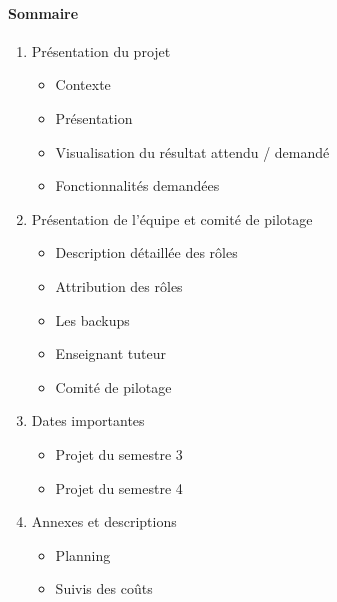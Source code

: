 \documentclass[11pt]{report}
\begin{document}
\paragraph{\LARGE Sommaire}
\begin{enumerate}
	\item Présentation du projet
	\begin{itemize}
	    \item Contexte
	    \item Présentation
	    \item Visualisation du résultat attendu / demandé
	    \item Fonctionnalités demandées
	\end{itemize}
	\item Présentation de l'équipe et comité de pilotage
    	\begin{itemize}
    	    \item Description détaillée des rôles
    	    \item Attribution des rôles
    	    \item Les backups
    	    \item Enseignant tuteur
    	    \item Comité de pilotage
    	\end{itemize}
	\item Dates importantes
    	\begin{itemize}
    	    \item Projet du semestre 3
    	    \item Projet du semestre 4
    	\end{itemize}
    \item Annexes et descriptions
        \begin{itemize}
    	    \item Planning
    	    \item Suivis des coûts
    	\end{itemize}
\end{enumerate}

\newpage
\end{document}
